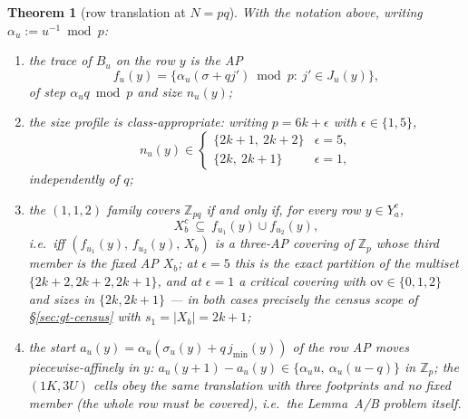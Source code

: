 \documentclass[11pt,a4paper]{article}
\numberwithin{equation}{section}
\theoremstyle{plain}
\newtheorem{theorem}{Theorem}[section]
\theoremstyle{definition}
\theoremstyle{remark}
\newcommand{\Z}{\mathbb{Z}}
\begin{document}
\begin{theorem}[row translation at $N=pq$]\label{thm:R}
With the notation above, writing $\alpha_u:=u^{-1}\bmod p$:
\begin{enumerate}[leftmargin=1.9em,itemsep=2pt]
\item[\textup{(i)}] the trace of $B_u$ on the row $y$ is the AP
\[
f_u(y)=\{\alpha_u(\sigma+qj')\bmod p:\ j'\in J_u(y)\},
\]
of step $\alpha_u q\bmod p$ and size $n_u(y)$;
\item[\textup{(ii)}] the size profile is class-appropriate: writing
$p=6k+\epsilon$ with $\epsilon\in\{1,5\}$,
\[
n_u(y)\in
\begin{cases}
\{2k+1,\ 2k+2\}&\epsilon=5,\\
\{2k,\ 2k+1\}&\epsilon=1,
\end{cases}
\]
independently of $q$;
\item[\textup{(iii)}] the $(1,1,2)$ family covers $\Z_{pq}$ if and only if,
for every row $y\in Y_a^{c}$,
\[
X_b^{c}\ \subseteq\ f_{u_1}(y)\cup f_{u_2}(y),
\]
i.e.\ iff $(f_{u_1}(y),\,f_{u_2}(y),\,X_b)$ is a three-AP covering of
$\Z_p$ whose third member is the \emph{fixed} AP $X_b$; at $\epsilon=5$ this
is the exact partition of the multiset $\{2k{+}2,2k{+}2,2k{+}1\}$, and at
$\epsilon=1$ a critical covering with $\mathrm{ov}\in\{0,1,2\}$ and sizes in
$\{2k,2k{+}1\}$ --- in both cases precisely the census scope of
\S\ref{sec:gt-census} with $s_1=|X_b|=2k+1$;
\item[\textup{(iv)}] the start $a_u(y)=\alpha_u(\sigma_u(y)+q\,j_{\min}(y))$
of the row AP moves \emph{piecewise-affinely} in $y$:
$a_u(y{+}1)-a_u(y)\in\{\alpha_u u,\ \alpha_u(u-q)\}$ in $\Z_p$; the
$(1K,3U)$ cells obey the same translation with three footprints and no fixed
member (the whole row must be covered), i.e.\ the Lemma~A/B problem itself.
\end{enumerate}
\end{theorem}
\end{document}
